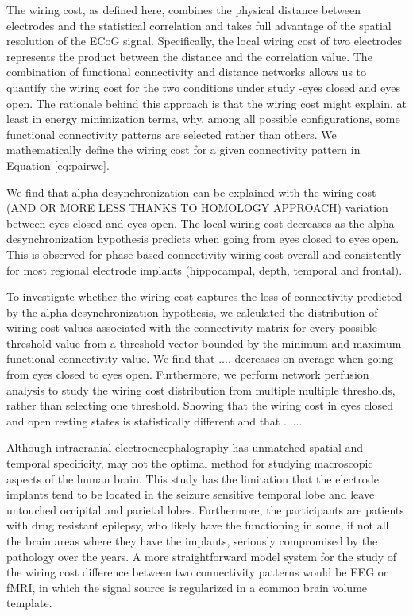 \documentclass[11pt, onecolumn]{article}
\begin{document}
The wiring cost, as defined here, combines the physical distance between electrodes and the statistical correlation and takes full advantage of the spatial resolution of the ECoG signal. Specifically, the local wiring cost of two electrodes represents the product between the distance and the correlation value. The combination of functional connectivity and distance networks allows us to quantify the wiring cost for the two conditions under study -eyes closed and eyes open.
The rationale behind this approach is that the wiring cost might explain, at least in energy minimization terms, why, among all possible configurations, some functional connectivity patterns are selected rather than others. We mathematically define the wiring cost for a given connectivity pattern in Equation \ref{eq:pairwc}. 

We find that alpha desynchronization can be explained with the wiring cost (AND OR MORE LESS THANKS TO HOMOLOGY APPROACH) variation between eyes closed and eyes open. The local wiring cost decreases as the alpha desynchronization hypothesis predicts when going from  eyes closed to eyes open. This is observed for phase based connectivity wiring cost overall and consistently for most regional electrode implants (hippocampal, depth, temporal and frontal).

To investigate whether the wiring cost captures the loss of connectivity predicted by the alpha desynchronization hypothesis, we calculated the distribution of wiring cost values associated with the connectivity matrix for every possible threshold value from a threshold vector bounded by the minimum and maximum functional connectivity value.
We find that .... decreases on average when going from eyes closed to eyes open. 
Furthermore, we perform network perfusion analysis to study the wiring cost distribution from multiple multiple thresholds, rather than selecting one threshold. Showing that the wiring cost in eyes closed and open resting states is statistically different and that ...... 

Although intracranial electroencephalography has unmatched spatial and temporal specificity, may not the optimal method for studying macroscopic aspects of the human brain. This study has the limitation that the electrode implants tend to be located in the seizure sensitive temporal lobe and leave untouched occipital and parietal lobes. Furthermore, the participants are patients with drug resistant epilepsy, who likely have the functioning in some, if not all the brain areas where they have the implants, seriously compromised by the pathology over the years. A more straightforward model system for the study of the wiring cost difference between two connectivity patterns would be EEG or fMRI, in which the signal source is regularized in a common brain volume template. 
\end{document}
